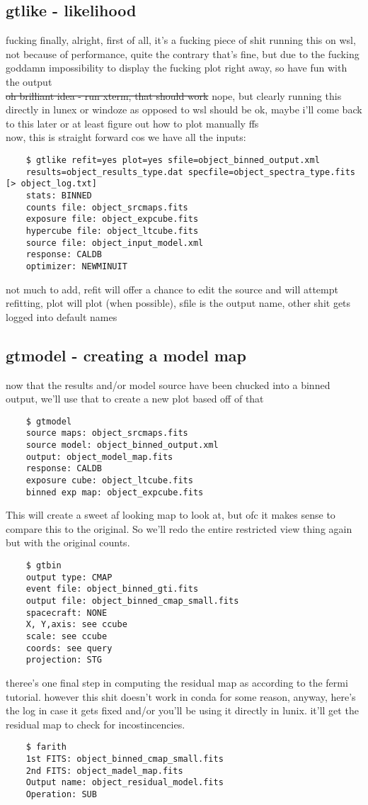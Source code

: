 \documentclass{article}
\begin{document}
\subsection{gtlike - likelihood}%
fucking finally, alright, first of all, it's a fucking piece of shit running this on wsl, not because of performance, quite the contrary that's fine, but due to the fucking goddamn impossibility to display the fucking plot right away, so have fun with the output\\
\sout{oh brilliant idea - run xterm, that should work} nope, but clearly running this directly in lunex or windoze as opposed to wsl should be ok, maybe i'll come back to this later or at least figure out how to plot manually ffs\\
now, this is straight forward cos we have all the inputs:
\begin{verbatim}
    $ gtlike refit=yes plot=yes sfile=object_binned_output.xml
    results=object_results_type.dat specfile=object_spectra_type.fits [> object_log.txt]
    stats: BINNED
    counts file: object_srcmaps.fits
    exposure file: object_expcube.fits
    hypercube file: object_ltcube.fits
    source file: object_input_model.xml
    response: CALDB
    optimizer: NEWMINUIT
\end{verbatim}
not much to add, refit will offer a chance to edit the source and will attempt refitting, plot will plot (when possible), sfile is the output name, other shit gets logged into default names

\subsection{gtmodel - creating a model map}%
now that the results and/or model source have been chucked into a binned output, we'll use that to create a new plot based off of that
\begin{verbatim}
    $ gtmodel
    source maps: object_srcmaps.fits
    source model: object_binned_output.xml
    output: object_model_map.fits
    response: CALDB
    exposure cube: object_ltcube.fits
    binned exp map: object_expcube.fits
\end{verbatim}
This will create a sweet af looking map to look at, but ofc it makes sense to compare this to the original. So we'll redo the entire restricted view thing again but with the original counts.
\begin{verbatim}
    $ gtbin
    output type: CMAP
    event file: object_binned_gti.fits
    output file: object_binned_cmap_small.fits
    spacecraft: NONE
    X, Y,axis: see ccube
    scale: see ccube
    coords: see query
    projection: STG
\end{verbatim}
theree's one final step in computing the residual map as according to the fermi tutorial. however this shit doesn't work in conda for some reason, anyway, here's the log in case it gets fixed and/or you'll be using it directly in lunix. it'll get the residual map to check for incostincencies.
\begin{verbatim}
    $ farith
    1st FITS: object_binned_cmap_small.fits
    2nd FITS: object_madel_map.fits
    Output name: object_residual_model.fits
    Operation: SUB
\end{verbatim}
\end{document}

